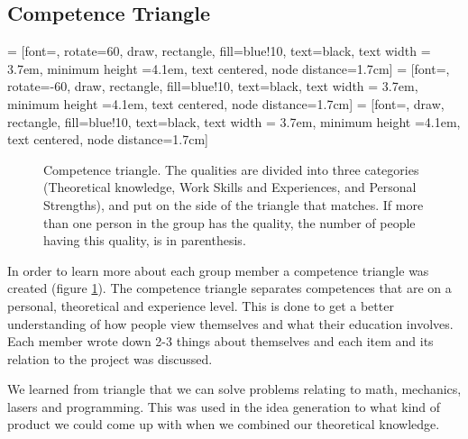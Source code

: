 \subsection{Competence Triangle}
 = [font=\footnotesize, rotate=60,  draw, rectangle, fill=blue!10, text=black, text width = 3.7em, minimum height =4.1em, text centered, node distance=1.7cm]
 =  [font=\footnotesize, rotate=-60, draw, rectangle, fill=blue!10, text=black, text width = 3.7em, minimum height =4.1em, text centered, node distance=1.7cm]
 = [font=\footnotesize,             draw, rectangle, fill=blue!10, text=black, text width = 3.7em, minimum height =4.1em, text centered, node distance=1.7cm]

\begin{figure}[!ht]
\centering
{}
\caption{Competence triangle. The qualities are divided into three categories (Theoretical knowledge, Work Skills and Experiences, and Personal Strengths), and put on the side of the triangle that matches. If more than one person in the group has the quality, the number of people having this quality, is in parenthesis.} \label{fig_triangle}
\end{figure}

In order to learn more about each group member a competence triangle was created (figure \ref{fig_triangle}). 
The competence triangle separates competences that are on a personal, theoretical and experience level. 
This is done to get a better understanding of how people view themselves and what their education involves.
Each member wrote down 2-3 things about themselves and each item and its relation to the project was discussed.

We learned from triangle that we can solve problems relating to math, mechanics, lasers and programming.
This was used in the idea generation to what kind of product we could come up with when we combined our theoretical knowledge.


